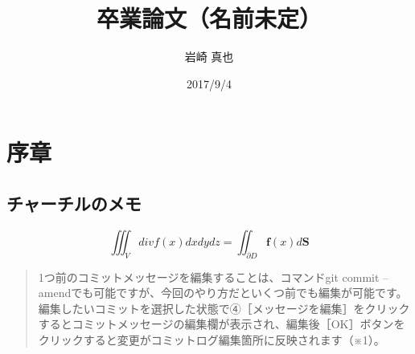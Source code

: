 \documentclass[twocolumn]{jsarticle}
\begin{document}

\title{卒業論文（名前未定）}
\author{岩崎 真也}
\date{2017/9/4}
\maketitle

\section{序章}

\subsection{チャーチルのメモ}

\begin{equation}
\iiint_V div f(x) dxdydz = \iint_{\partial D} \mathbf{f}(x) d \mathbf{S}  
\end{equation}

\begin{quotation}
1つ前のコミットメッセージを編集することは、コマンドgit commit --amendでも可能ですが、今回のやり方だといくつ前でも編集が可能です。編集したいコミットを選択した状態で④［メッセージを編集］をクリックするとコミットメッセージの編集欄が表示され、編集後［OK］ボタンをクリックすると変更がコミットログ編集箇所に反映されます（※1）。
\end{quotation}

\end{document}
